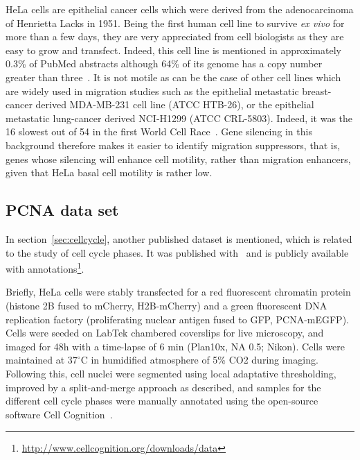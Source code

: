 HeLa cells are epithelial cancer cells which were derived from the adenocarcinoma of Henrietta Lacks in 1951. Being the first human cell line to survive \textit{ex vivo} for more than a few days, they are very appreciated from cell biologists as they are easy to grow and transfect. Indeed, this cell line is mentioned in approximately 0.3\% of PubMed abstracts although 64\% of its genome has a copy number greater than three~\cite{pmid23925245}. It is not motile as can be the case of other cell lines which are widely used in migration studies such as the epithelial metastatic breast-cancer derived MDA-MB-231 cell line (ATCC\up{\textregistered} HTB-26\texttrademark), or the epithelial metastatic lung-cancer derived NCI-H1299 (ATCC\up{\textregistered} CRL-5803\texttrademark). Indeed, it was the 16 slowest out of 54 in the first World Cell Race~\cite{pmid22974990}. Gene silencing in this background therefore makes it easier to identify migration suppressors, that is, genes whose silencing will enhance cell motility, rather than migration enhancers, given that HeLa basal cell motility is rather low.

\subsection{PCNA data set}
In section~\ref{sec:cellcycle}, another published dataset is mentioned, which is related to the study of cell cycle phases. It was published with~\cite{cellcognition} and is publicly available with annotations\footnote{\href{http://www.cellcognition.org/downloads/data}{http://www.cellcognition.org/downloads/data}}.

Briefly, HeLa cells were stably transfected for a red fluorescent chromatin protein (histone 2B fused to mCherry, H2B-mCherry) and a green fluorescent DNA replication factory (proliferating nuclear antigen fused to GFP, PCNA-mEGFP). Cells were seeded on LabTek chambered coverslips for live microscopy, and imaged for 48h with a time-lapse of 6 min (Plan10x, NA 0.5; Nikon). Cells were maintained at $37^\circ$C in humidified atmosphere of 5\% CO2 during imaging. Following this, cell nuclei were segmented using local adaptative thresholding, improved by a split-and-merge approach as described, and samples for the different cell cycle phases were manually annotated using the open-source software Cell Cognition~\cite{cellcognition}.
%
